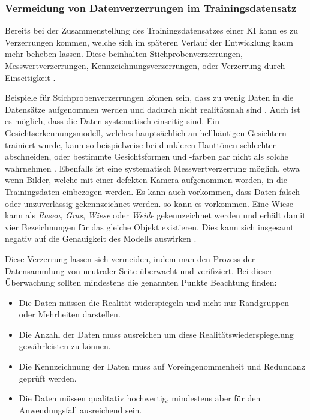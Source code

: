 \documentclass[12pt]{article}
\begin{document}
\subsubsection{Vermeidung von Datenverzerrungen im Trainingsdatensatz}
Bereits bei der Zusammenstellung des Trainingsdatensatzes einer KI kann es zu Verzerrungen kommen, welche sich im späteren Verlauf der Entwicklung kaum mehr beheben lassen.
Diese beinhalten Stichprobenverzerrungen, Messwertverzerrungen, Kennzeichnungsverzerrungen, oder Verzerrung durch Einseitigkeit \cite{Srinivasan}.

Beispiele für Stichprobenverzerrungen können sein, dass zu wenig Daten in die Datensätze aufgenommen werden und dadurch nicht realitätsnah sind \cite{Srinivasan}.
Auch ist es möglich, dass die Daten systematisch einseitig sind. Ein Gesichtserkennungsmodell, welches hauptsächlich an hellhäutigen Gesichtern trainiert wurde,
kann so beispielweise bei dunkleren Hauttönen schlechter abschneiden, oder bestimmte Gesichtsformen und -farben gar nicht als solche wahrnehmen \cite{Srinivasan}.
Ebenfalls ist eine systematisch Messwertverzerrung möglich, etwa wenn Bilder, welche mit einer defekten Kamera aufgenommen worden, in die Trainingsdaten einbezogen werden.
Es kann auch vorkommen, dass Daten falsch oder unzuverlässig gekennzeichnet werden. so kann es vorkommen. Eine Wiese kann als \textit{Rasen}, \textit{Gras}, \textit{Wiese} oder \textit{Weide} gekennzeichnet werden und erhält damit vier Bezeichnungen für das gleiche Objekt existieren. Dies kann sich insgesamt negativ auf die Genauigkeit des Modells auswirken \cite{Srinivasan}.

Diese Verzerrung lassen sich vermeiden, indem man den Prozess der Datensammlung von neutraler Seite überwacht und verifiziert.
Bei dieser Überwachung sollten mindestens die genannten Punkte Beachtung finden: 
\begin{itemize}
    \item Die Daten müssen die Realität widerspiegeln und nicht nur Randgruppen oder Mehrheiten darstellen.
    \item Die Anzahl der Daten muss ausreichen um diese Realitätswiederspiegelung gewährleisten zu können.
    \item Die Kennzeichnung der Daten muss auf Voreingenommenheit und Redundanz geprüft werden.
    \item Die Daten müssen qualitativ hochwertig, mindestens aber für den Anwendungsfall ausreichend sein.
\end{itemize}
\end{document}
